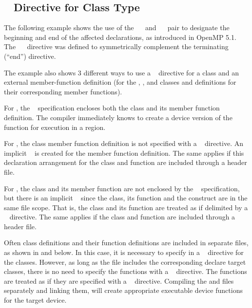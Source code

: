 \subsection{~ Directive for Class Type}
\label{subsec:declare_target_class}

The following example shows the use of the ~~
and ~~ pair to designate the beginning and
end of the affected declarations, as introduced in OpenMP 5.1.
The ~~ directive was defined
to symmetrically complement the terminating (``end'') directive.

\cppspecificstart

The example also shows 3 different ways to use a ~ directive for a 
class and an external member-function definition (for the , , 
and  classes and definitions for their corresponding  member functions).

For , the ~ specification 
encloses both the class and its member function definition. The compiler immediately
knows to create a device version of the function for execution in a  region.

For , the class member function definition is not specified with a
~ directive.
An implicit ~ is created for the member function definition.
The same applies if this declaration arrangement for the class and function 
are included through a header file.

For , the class and its member function are not enclosed by the ~
specification, but there is an implicit ~ since the class, its function
and the  construct are in the same file scope. That is, the class
and its function are treated as if delimited by a ~ directive.
The same applies if the class and function are included through a header file.


\begin{figure}[t!]
\end{figure}

Often class definitions and their function definitions are included in separate files,
as shown in  and  below.
In this case, it is necessary to specify in a ~ directive for the classes.
However, as long as the  file includes the corresponding declare target classes,
there is no need to specify the functions with a ~ directive.
The functions are treated as if they are specified with a ~ directive.
Compiling the  and  files 
separately and linking them, will create appropriate executable device functions for the target device.

